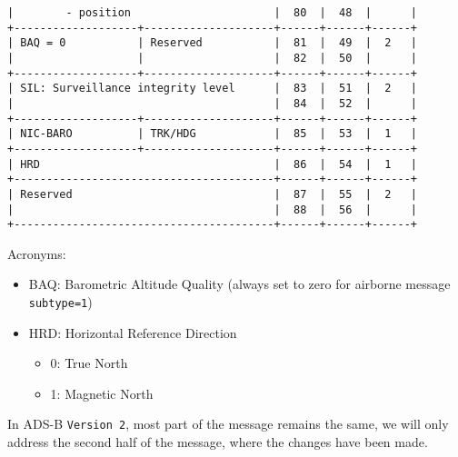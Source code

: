 \begin{verbatim}
|        - position                      |  80  |  48  |      |
+-------------------+--------------------+------+------+------+
| BAQ = 0           | Reserved           |  81  |  49  |  2   |
|                   |                    |  82  |  50  |      |
+-------------------+--------------------+------+------+------+
| SIL: Surveillance integrity level      |  83  |  51  |  2   |
|                                        |  84  |  52  |      |
+-------------------+--------------------+------+------+------+
| NIC-BARO          | TRK/HDG            |  85  |  53  |  1   |
+-------------------+--------------------+------+------+------+
| HRD                                    |  86  |  54  |  1   |
+----------------------------------------+------+------+------+
| Reserved                               |  87  |  55  |  2   |
|                                        |  88  |  56  |      |
+----------------------------------------+------+------+------+
\end{verbatim}

Acronyms:

\begin{itemize}

\item
  BAQ: Barometric Altitude Quality (always set to zero for airborne
  message \texttt{subtype=1})
\item
  HRD: Horizontal Reference Direction

  \begin{itemize}

  \item
    0: True North
  \item
    1: Magnetic North
  \end{itemize}
\end{itemize}

In ADS-B \texttt{Version\ 2}, most part of the message remains the same, we will only address the second half of the message, where the changes have been made.

